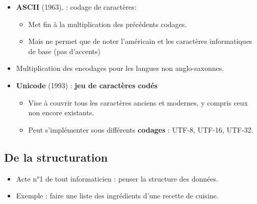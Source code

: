 \begin{slide}
	\begin{itemize}
		\item \textbf{ASCII} (1963),  : codage de caractères:
			\begin{itemize}
				\item Met fin à la multiplication des précédents codages.
				\item Mais ne permet que de noter l'américain et les caractères informatiques de base (pas d'accents)
			\end{itemize}
		\item Multiplication des encodages pour les langues non anglo-saxonnes.
		\item \textbf{Unicode} (1993) : \textbf{jeu de caractères codés}
			\begin{itemize}
				\item Vise à couvrir tous les caractères anciens et modernes, y compris ceux non encore existants.
				\item Peut s'implémenter sous différents \textbf{codages} : UTF-8, UTF-16, UTF-32.
			\end{itemize}
	\end{itemize}
\end{slide}

\subsection{De la structuration}
\begin{slide}
	\begin{itemize}
		\item Acte n°1 de tout informaticien : penser la structure des données.
		\item Exemple : faire une liste des ingrédients d'une recette de cuisine.
	\end{itemize}
\end{slide}

